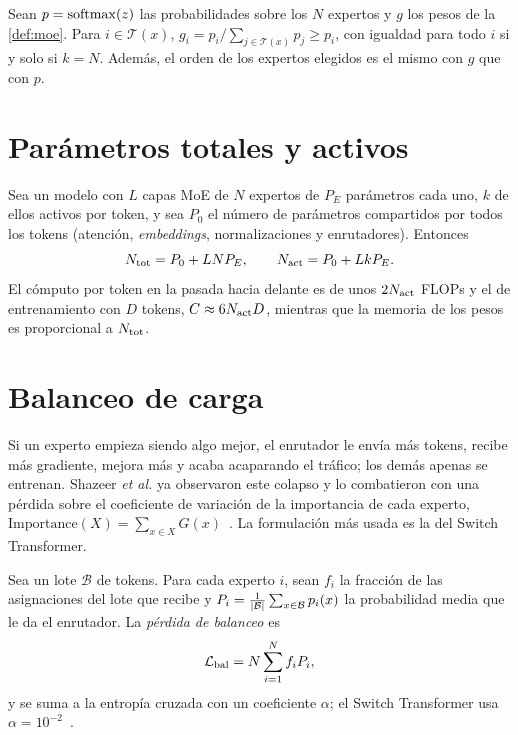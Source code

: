 \begin{proposicion}[Renormalización]\label{prop:renorm}
Sean $p=\operatorname{softmax}(z)$ las probabilidades sobre los $N$ expertos y $g$ los pesos de la \cref{def:moe}. Para $i\in\mathcal T(x)$, $g_i=p_i/\sum_{j\in\mathcal T(x)}p_j\ge p_i$, con igualdad para todo $i$ si y solo si $k=N$. Además, el orden de los expertos elegidos es el mismo con $g$ que con $p$.
\end{proposicion}

\addtocounter{definicion}{1}%

\section{Parámetros totales y activos}

\begin{proposicion}\label{prop:activos}
Sea un modelo con $L$ capas MoE de $N$ expertos de $P_E$ parámetros cada uno, $k$ de ellos activos por token, y sea $P_0$ el número de parámetros compartidos por todos los tokens (atención, \emph{embeddings}, normalizaciones y enrutadores). Entonces
\[
N_{\mathrm{tot}}=P_0+LNP_E,\qquad N_{\mathrm{act}}=P_0+LkP_E .
\]
El cómputo por token en la pasada hacia delante es de unos $2N_{\mathrm{act}}$ FLOPs y el de entrenamiento con $D$ tokens, $C\approx 6N_{\mathrm{act}} D$, mientras que la memoria de los pesos es proporcional a $N_{\mathrm{tot}}$.
\end{proposicion}

\addtocounter{definicion}{1}%

\section{Balanceo de carga}

Si un experto empieza siendo algo mejor, el enrutador le envía más tokens, recibe más gradiente, mejora más y acaba acaparando el tráfico; los demás apenas se entrenan. Shazeer \emph{et al.} ya observaron este colapso y lo combatieron con una pérdida sobre el coeficiente de variación de la importancia de cada experto, $\mathrm{Importance}(X)=\sum_{x\in X}G(x)$~\cite[§4]{shazeer2017}. La formulación más usada es la del Switch Transformer.

\begin{definicion}\label{def:bal}
Sea un lote $\mathcal B$ de tokens. Para cada experto $i$, sean $f_i$ la fracción de las asignaciones del lote que recibe y $P_i=\frac{1}{\lvert\mathcal B\rvert}\sum_{x\in\mathcal B}p_i(x)$ la probabilidad media que le da el enrutador. La \emph{pérdida de balanceo} es
\[
\mathcal{L}_{\mathrm{bal}}=N\sum_{i=1}^{N}f_iP_i,
\]
y se suma a la entropía cruzada con un coeficiente $\alpha$; el Switch Transformer usa $\alpha=10^{-2}$~\cite[§2.2, ecs.~4--6]{switch}.
\end{definicion}

